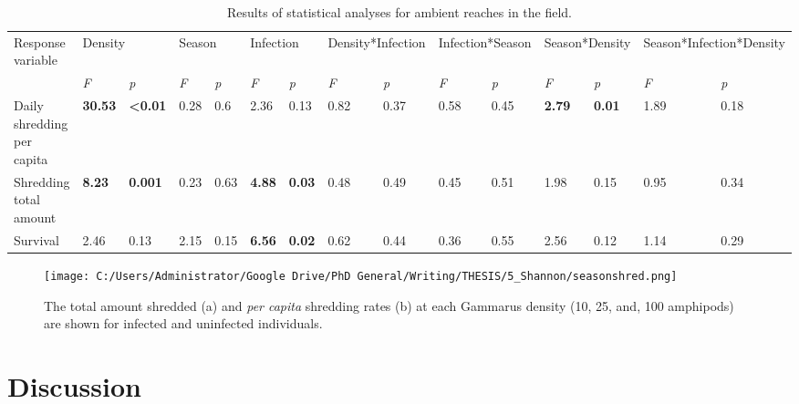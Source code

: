\begin{table}[]
\caption[Results of analysis of interannual variation in rates of shredding and survival of \emph{Gammarus duebeni}. Statistically significant effects are shown in bold.]{Results of statistical analyses for ambient reaches in the field.}
\label{tab:seasonstats}
\begin{tabular}{lllllllllllllll}
Response variable & \multicolumn{2}{l}{Density} & \multicolumn{2}{l}{Season} & \multicolumn{2}{l}{Infection} & \multicolumn{2}{l}{Density*Infection} & \multicolumn{2}{l}{Infection*Season} & \multicolumn{2}{l}{Season*Density} & \multicolumn{2}{l}{Season*Infection*Density} \\
\textit{} & \textit{F} & \textit{p} & \textit{F} & \textit{p} & \textit{F} & \textit{p} & \textit{F} & \textit{p} & \textit{F} & \textit{p} & \textit{F} & \textit{p} & \textit{F} & \textit{p} \\
Daily shredding per capita & \textbf{30.53} & \textbf{<0.01} & 0.28 & 0.6 & 2.36 & 0.13 & 0.82 & 0.37 & 0.58 & 0.45 & \textbf{2.79} & \textbf{0.01} & 1.89 & 0.18 \\
Shredding total amount & \textbf{8.23} & \textbf{0.001} & 0.23 & 0.63 & \textbf{4.88} & \textbf{0.03} & 0.48 & 0.49 & 0.45 & 0.51 & 1.98 & 0.15 & 0.95 & 0.34 \\
Survival & 2.46 & 0.13 & 2.15 & 0.15 & \textbf{6.56} & \textbf{0.02} & 0.62 & 0.44 & 0.36 & 0.55 & 2.56 & 0.12 & 1.14 & 0.29
\end{tabular}
\end{table}

\begin{figure}%
    \centering
    \texttt{[image: C:/Users/Administrator/Google Drive/PhD General/Writing/THESIS/5\_Shannon/seasonshred.png]}
  \caption [Shredding by \emph{G. duebeni} during the winter and summer field experiments.]{The total amount shredded (a) and \emph{per capita} shredding rates (b) at each Gammarus density (10, 25, and, 100 amphipods) are shown for infected and uninfected individuals.} 
    \label{fig:seasonshred}
\end{figure}

\section{Discussion}

